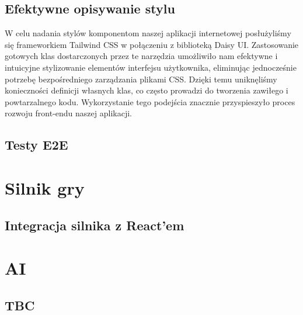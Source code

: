 \subsection{Efektywne opisywanie stylu}
W celu nadania stylów komponentom naszej aplikacji internetowej posłużyliśmy się frameworkiem Tailwind CSS w połączeniu z biblioteką Daisy UI. Zastosowanie gotowych klas dostarczonych przez te narzędzia umożliwiło nam efektywne i intuicyjne stylizowanie elementów interfejsu użytkownika, eliminując jednocześnie potrzebę bezpośredniego zarządzania plikami CSS. Dzięki temu uniknęliśmy konieczności definicji własnych klas, co często prowadzi do tworzenia zawiłego i powtarzalnego kodu. Wykorzystanie tego podejścia znacznie przyspieszyło proces rozwoju front-endu naszej aplikacji.
\subsection{Testy E2E}


\section{Silnik gry}

\subsection{Integracja silnika z React'em}


\section{AI}

\subsection{TBC}
